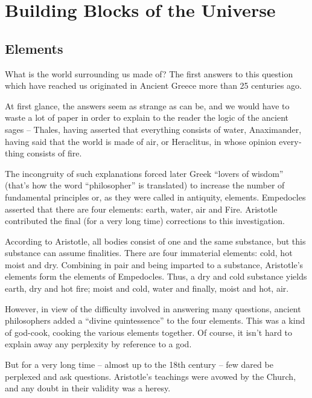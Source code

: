 

\cleardoublepage
\chapter{Building Blocks of the Universe}
\label{ch-01}

\section{Elements}
What is the world surrounding us made of? The first answers to this question which have reached us originat­ed in Ancient Greece more than 25 centuries ago.

At first glance, the answers seem as strange as can be, and we would have to waste a lot of paper in order to explain to the reader the logic of the ancient sages -- Thales, having asserted that everything consists of water, Anaximander, having said that the world is made of air, or Heraclitus, in whose opinion every­ thing consists of fire.

The incongruity of such explanations forced later Greek ``lovers of wisdom'' (that’s how the word ``philos­opher'' is translated) to increase the number of funda­mental principles or, as they were called in antiquity, elements. Empedocles asserted that there are four ele­ments: earth, water, air and Fire. Aristotle contributed the final (for a very long time) corrections to this in­vestigation.

According to Aristotle, all bodies consist of one and the same substance, but this substance can assume finalities. There are four immaterial elements: cold, hot moist and dry. Combining in pair and being imparted to a substance, Aristotle’s elements form the
elements of Empedocles. Thus, a dry and cold substance
yields earth, dry and hot fire; moist and cold, water and finally, moist and hot, air.

However, in view of the difficulty involved in an­swering many questions, ancient philosophers added a ``divine quintessence'' to the four elements. This was a kind of god-cook, cooking the various elements together. Of course, it isn’t hard to explain away any perplexity by reference to a god.

But for a very long time -- almost up to the 18th cen­tury -- few dared be perplexed and ask questions. Aris­totle’s teachings were avowed by the Church, and any doubt in their validity was a heresy.

